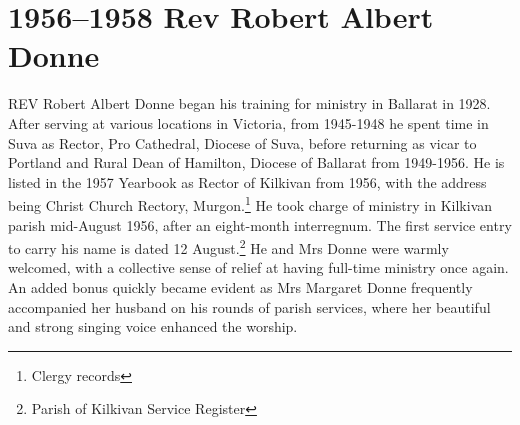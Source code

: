 \balance


\printendnotes[custom]
\setcounter{endnote}{0}
\chapter{1956--1958 Rev Robert Albert Donne}
\nobalance


\lettrine[lines=3]{R}{EV}
 Robert Albert Donne began his training for ministry in Ballarat in 1928. After serving at various locations in Victoria, from 1945-1948 he spent time in Suva as Rector, Pro Cathedral, Diocese of Suva, before returning as vicar to Portland and Rural Dean of Hamilton, Diocese of Ballarat from 1949-1956. He is listed in the 1957 Yearbook as Rector of Kilkivan from 1956, with the address being Christ Church Rectory, Murgon.\footnote{Clergy records} He took charge of ministry in Kilkivan parish mid-August 1956, after an eight-month interregnum. The first service entry to carry his name is dated 12 August.\footnote{Parish of Kilkivan Service Register} He and Mrs Donne were warmly welcomed, with a collective sense of relief at having full-time ministry once again. An added bonus quickly became evident as Mrs Margaret Donne frequently accompanied her husband on his rounds of parish services, where her beautiful and strong singing voice enhanced the worship.







